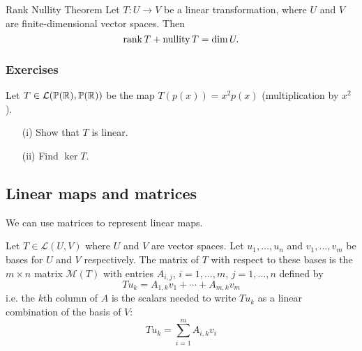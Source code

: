 \documentclass{article}
\begin{document}
\begin{theorem}{Rank Nullity Theorem}
Let $T:U \to V$ be a linear transformation, where $U$ and $V$ are finite-dimensional vector spaces. Then  
\begin{equation*}
\operatorname{rank} T + \operatorname{nullity}  T = \dim U.
\end{equation*}
\end{theorem}

\subsubsection{Exercises}
\begin{exercise}
Let $T \in {\mathcal{L}}(\mathbb{P}({\mathbb{R}}),\mathbb{P}({\mathbb{R}}))$ be the map $T (p(x))= x^2 p(x)$ (multiplication by $x^2$). 
\begin{enumerate}
    \item[(i)] Show that $T$ is linear.
    \item[(ii)] Find $\ker T$.
\end{enumerate}
\end{exercise}

\subsection{Linear maps and matrices}
We can use matrices to represent linear maps. 

\begin{definition}
Let $T \in \mathcal{L}(U,V)$ where $U$ and $V$ are vector spaces. Let $u_1, \ldots, u_n$ and $v_1, \ldots, v_m$ be bases for $U$ and $V$ respectively. The matrix of $T$ with respect to these bases is the $m \times n$ matrix $\mathcal{M}(T)$ with entries $A_{i,j}$, $i = 1, \ldots, m$, $j = 1, \ldots, n$ defined by
\begin{equation*}
    T u_k = A_{1,k} v_1 + \cdots + A_{m,k} v_m
\end{equation*}
i.e. the $k$th column of $A$ is the scalars needed to write $T u_k$ as a linear combination of the basis of $V$:
\begin{equation*}
    T u_k = \sum_{i=1}^m A_{i,k} v_i 
\end{equation*}
\end{definition}
\end{document}
